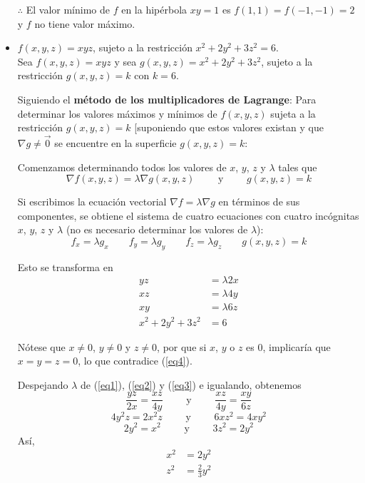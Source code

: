 \documentclass[12pt]{article}
\begin{document}
\begin{itemize}[format=\textbf]
    $\therefore $ El valor mínimo de $f$ en la hipérbola $xy=1$ es $f(1,1)=f(-1,-1)=2$ y $f$ no tiene valor máximo.

\item $f(x, y, z) = xyz$, sujeto a la restricción $x^2 + 2y^2 + 3z^2 = 6$. \\

  Sea $f(x,y,z)=xyz$ y sea $g(x,y,z)=x^2 + 2y^2 + 3z^2 $, sujeto a la restricción $g(x,y,z)=k$ con $k=6$.
  
  Siguiendo el \textbf{método de los multiplicadores de Lagrange}: Para determinar los valores máximos y mínimos de $f (x, y,z)$ sujeta a la restricción $g(x,y,z)=k$ [suponiendo que estos valores existan y que $\nabla g \neq \vec{0}$ se encuentre en la superficie $g(x,y,z)=k$:

    Comenzamos determinando todos los valores de $x$, $y$, $z$ y $\lambda$ tales que
    $$ \nabla f(x,y,z) = \lambda \nabla g(x,y,z) \qquad \text{ y } \qquad g(x,y,z)=k$$

    Si escribimos la ecuación vectorial $\nabla f = \lambda \nabla g$ en términos de sus componentes, se obtiene el sistema de cuatro ecuaciones con cuatro incógnitas $x$, $y$, $z$ y $\lambda$ (no es necesario determinar los valores de $\lambda$):
    $$f_x= \lambda g_x \qquad f_y=\lambda g_y \qquad f_z=\lambda g_z\qquad g(x,y,z)=k$$

    Esto se transforma en
    \setcounter{equation}{0}
    \begin{align}
      yz &= \lambda 2x \label{eq1} \\
      xz &= \lambda 4y \label{eq2} \\
      xy &= \lambda 6z \label{eq3} \\
      x^2 + 2y^2 + 3z^2 &= 6 \label{eq4}
    \end{align}

    Nótese que $x \neq 0$, $y \neq 0$ y $z \neq 0$, por que si $x$, $y$ o $z$ es 0, implicaría que $x=y=z=0$, lo que contradice (\ref{eq4}).

    Despejando $\lambda$ de (\ref{eq1}), (\ref{eq2}) y (\ref{eq3}) e igualando, obtenemos
    $$\frac{yz}{2x} = \frac{xz}{4y} \qquad \text{ y } \qquad \frac{xz}{4y} = \frac{xy}{6z}$$
    $$4y^2z=2x^2z \qquad \text{ y } \qquad 6xz^2=4xy^2$$
    $$2y^2=x^2 \qquad \text{ y } \qquad 3z^2=2y^2$$
    Así,
    \begin{align}
      x^2 &= 2y^2 \label{eq5} \\
      z^2 &= \frac{2}{3}y^2 \label{eq6}
    \end{align}


\end{itemize}
\end{document}

